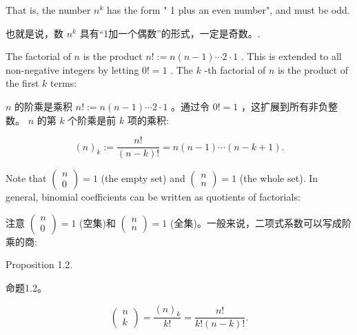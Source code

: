 \documentclass[10pt]{article}
\begin{document}
That is, the number \({n}^{k}\) has the form " 1 plus an even number", and must be odd.

\begin{tcolorbox}\relax
也就是说，数 \({n}^{k}\) 具有“1加一个偶数”的形式，一定是奇数。.
\end{tcolorbox}

The factorial of \(n\) is the product \(n! \mathrel{\text{ := }} n\left( {n - 1}\right) \cdots 2 \cdot  1\) . This is extended to all non-negative integers by letting \(0! = 1\) . The \(k\) -th factorial of \(n\) is the product of the first \(k\) terms:

\begin{tcolorbox}\relax
\(n\) 的阶乘是乘积 \(n! \mathrel{\text{ := }} n\left( {n - 1}\right) \cdots 2 \cdot  1\) 。通过令 \(0! = 1\) ，这扩展到所有非负整数。 \(n\) 的第 \(k\) 个阶乘是前 \(k\) 项的乘积:
\end{tcolorbox}

\[
{\left( n\right) }_{k} \mathrel{\text{ := }} \frac{n!}{\left( {n - k}\right) !} = n\left( {n - 1}\right) \cdots \left( {n - k + 1}\right) .
\]

Note that \(\left( \begin{array}{l} n \\  0 \end{array}\right)  = 1\) (the empty set) and \(\left( \begin{array}{l} n \\  n \end{array}\right)  = 1\) (the whole set). In general, binomial coefficients can be written as quotients of factorials:

\begin{tcolorbox}\relax
注意 \(\left( \begin{array}{l} n \\  0 \end{array}\right)  = 1\) (空集)和 \(\left( \begin{array}{l} n \\  n \end{array}\right)  = 1\) (全集)。一般来说，二项式系数可以写成阶乘的商:
\end{tcolorbox}

Proposition 1.2.

\begin{tcolorbox}\relax
命题1.2。
\end{tcolorbox}

\[
\left( \begin{array}{l} n \\  k \end{array}\right)  = \frac{{\left( n\right) }_{k}}{k!} = \frac{n!}{k!\left( {n - k}\right) !}.
\]
\end{document}
